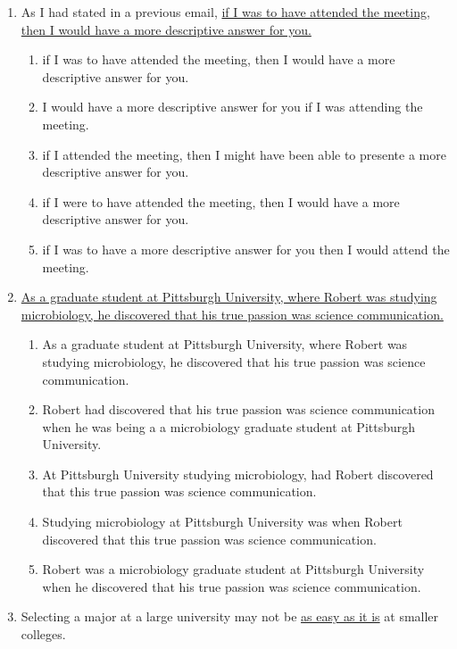 \begin{enumerate}
\item As I had stated in a previous email, \ul{if I was to have attended the meeting, then I would have a more descriptive answer for you.}

\bigskip
\begin{enumerate}[label=(\Alph*)]
\item if I was to have attended the meeting, then I would have a more descriptive answer for you.
\item I would have a more descriptive answer for you if I was attending the meeting.
\item if I attended the meeting, then I might have been able to presente a more descriptive answer for you. 
\item if I were to have attended the meeting, then I would have a more descriptive answer for you. 
\item  if I was to have a more descriptive answer for you then I would attend the meeting. 
\end{enumerate}

\item \ul{As a graduate student at Pittsburgh University, where Robert was studying microbiology, he discovered that his true passion was science communication.}

\bigskip
\begin{enumerate}[label=(\Alph*)]
\item As a graduate student at Pittsburgh University, where Robert was studying microbiology, he discovered that his true passion was science communication.
\item Robert had discovered that his true passion was science communication when he was being a a microbiology graduate student at Pittsburgh University.
\item At Pittsburgh University studying microbiology, had Robert discovered that this true passion was science communication. 
\item Studying microbiology at Pittsburgh University was when Robert discovered that this true passion was science communication. 
\item Robert was a microbiology graduate student at Pittsburgh University when he discovered that his true passion was science communication.
\end{enumerate}

\item Selecting a major at a large university may not be \ul{as easy as it is} at smaller colleges. 


\end{enumerate}
